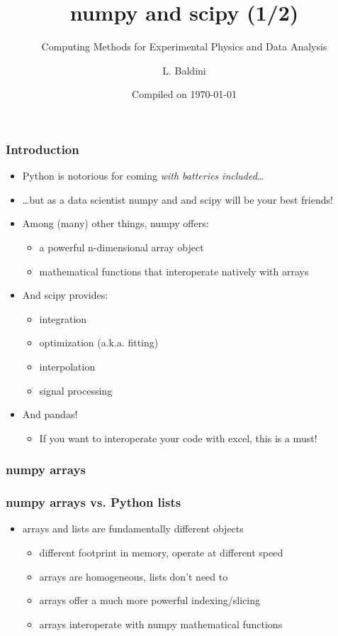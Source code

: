 \documentclass[9pt]{beamer}
\title{numpy and scipy (1/2)}
\subtitle{Computing Methods for Experimental Physics and Data Analysis}
\date{Compiled on \today}
\author{L. Baldini}
\institute[UNIPI and INFN]{Universit\`a and INFN--Pisa}
\begin{document}
\titleframe

\begin{frame}
  \frametitle{Introduction}
  \begin{itemize}
  \item Python is notorious for coming \emph{with batteries included}\ldots
  \item \ldots but as a data scientist numpy and and scipy will be your
    best friends!
  \item Among (many) other things, numpy offers:
    \begin{itemize}
    \item a powerful n-dimensional array object
    \item mathematical functions that interoperate natively with arrays
    \end{itemize}
  \item And scipy provides:
    \begin{itemize}
    \item integration
    \item optimization (a.k.a. fitting)
    \item interpolation
    \item signal processing
    \end{itemize}
  \item And pandas!
    \begin{itemize}
      \item If you want to interoperate your code with excel, this is a must!
    \end{itemize}
  \end{itemize}
\end{frame}


\begin{frame}
  \frametitle{numpy arrays}
  
\end{frame}


\begin{frame}
  \frametitle{numpy arrays vs. Python lists}
  

  \begin{itemize}
  \item arrays and lists are fundamentally different objects
    \begin{itemize}
    \item different footprint in memory, operate at different speed
    \item arrays are homogeneous, lists don't need to
    \item arrays offer a much more powerful indexing/slicing
    \item arrays interoperate with numpy mathematical functions
    \end{itemize}
  \end{itemize}
\end{frame}
\end{document}
